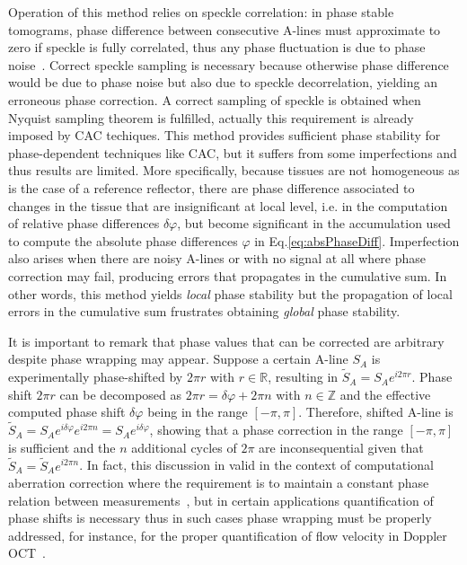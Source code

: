 Operation of this method relies on speckle correlation: in phase stable tomograms, phase difference between consecutive A-lines must approximate to zero if speckle is fully correlated, thus any phase fluctuation is due to phase noise~\cite{White2003_vivo}. Correct speckle sampling is necessary because otherwise phase difference would be due to phase noise but also due to speckle decorrelation, yielding an erroneous phase correction. A correct sampling of speckle is obtained when Nyquist sampling theorem is fulfilled, actually this requirement is already imposed by CAC techiques. This method provides sufficient phase stability for phase-dependent techniques like CAC, but it suffers from some imperfections and thus results are limited. More specifically, because tissues are not homogeneous as is the case of a reference reflector, there are phase difference associated to changes in the tissue that are insignificant at local level, i.e. in the computation of relative phase differences $\delta\varphi$, but become significant in the accumulation used to compute the absolute phase differences $\varphi$ in Eq.\eqref{eq:absPhaseDiff}. Imperfection also arises when there are noisy A-lines or with no signal at all where phase correction may fail, producing errors that propagates in the cumulative sum. In other words, this method yields \textit{local} phase stability but the propagation of local errors in the cumulative sum frustrates obtaining \textit{global} phase stability.

It is important to remark that phase values that can be corrected are arbitrary despite phase wrapping may appear. Suppose a certain A-line $S_A$ is experimentally phase-shifted by $2\pi r$ with $r\in\mathbb{R}$, resulting in $\tilde{S}_A=S_Ae^{i2\pi r}$. Phase shift $2\pi r$ can be decomposed as $2\pi r = \delta\varphi + 2\pi n$ with $n\in \mathbb{Z}$ and the effective computed phase shift $\delta\varphi$ being in the range $[-\pi, \pi]$. Therefore, shifted A-line is $\tilde{S}_A=S_Ae^{i\delta\varphi} e^{i2\pi n}=S_A e^{i\delta\varphi}$, showing that a phase correction in the range $[-\pi, \pi]$ is sufficient and the $n$ additional cycles of $2\pi$ are inconsequential given that $\tilde{S}_A = \tilde{S}_Ae^{i2\pi n}$. In fact, this discussion in valid in the context of computational aberration correction where the requirement is to maintain a constant phase relation between measurements~\cite{Shemonski2014_Stability}, but in certain applications quantification of phase shifts is necessary thus in such cases phase wrapping must be properly addressed, for instance, for the proper quantification of flow velocity in Doppler OCT~\cite{Hong2012_Highpenetration}.

